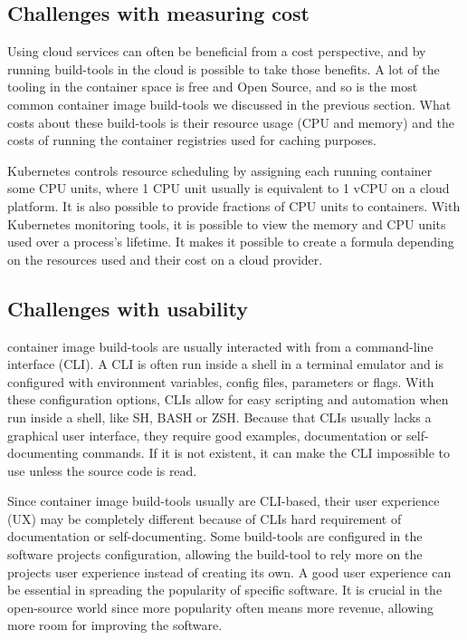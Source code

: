 \subsection{Challenges with measuring cost}
Using cloud services can often be beneficial from a cost perspective\cite{cloud_economics}, and by running build-tools in the cloud is possible to take those benefits. A lot of the tooling in the container space is free and Open Source, and so is the most common container image build-tools we discussed in the previous section. What costs about these build-tools is their resource usage (CPU and memory) and the costs of running the container registries used for caching purposes. 

Kubernetes controls resource scheduling by assigning each running container some CPU units, where 1 CPU unit usually is equivalent to 1 vCPU on a cloud platform. It is also possible to provide fractions of CPU units to containers. With Kubernetes monitoring tools, it is possible to view the memory and CPU units used over a process's lifetime. It makes it possible to create a formula depending on the resources used and their cost on a cloud provider. 

\subsection{Challenges with usability}
container image build-tools are usually interacted with from a command-line interface (CLI). A CLI is often run inside a shell in a terminal emulator and is configured with environment variables, config files, parameters or flags.  With these configuration options, CLIs allow for easy scripting and automation when run inside a shell, like SH, BASH or ZSH. Because that CLIs usually lacks a graphical user interface, they require good examples, documentation or self-documenting commands. If it is not existent, it can make the CLI impossible to use unless the source code is read. 

Since container image build-tools usually are CLI-based, their user experience (UX) may be completely different because of CLIs hard requirement of documentation or self-documenting. Some build-tools are configured in the software projects configuration, allowing the build-tool to rely more on the projects user experience instead of creating its own. A good user experience can be essential in spreading the popularity of specific software. It is crucial in the open-source world since more popularity often means more revenue, allowing more room for improving the software. 


